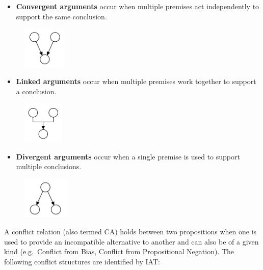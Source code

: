 \documentclass[twocolumn]{article}
\providecommand{\tightlist}{%
  \setlength{\itemsep}{0pt}\setlength{\parskip}{0pt}}
\begin{document}
\begin{itemize}
\tightlist
\item
  \textbf{Convergent arguments} occur when multiple premises act
  independently to support the same conclusion.
\end{itemize}

\begin{figure}[H]
    \centering
    \includegraphics[height=2cm]{convergent}
\end{figure}

\begin{itemize}
\tightlist
\item
  \textbf{Linked arguments} occur when multiple premises work together
  to support a conclusion.
\end{itemize}

\begin{figure}[H]
    \centering
    \includegraphics[height=2cm]{linked}
\end{figure}

\begin{itemize}
\tightlist
\item
  \textbf{Divergent arguments} occur when a single premise is used to
  support multiple conclusions.
\end{itemize}

\begin{figure}[H]
    \centering
    \includegraphics[height=2cm]{divergent}
\end{figure}

A conflict relation (also termed CA) holds between two propositions when
one is used to provide an incompatible alternative to another and can
also be of a given kind (e.g.~Conflict from Bias, Conflict from
Propositional Negation). The following conflict structures are
identified by IAT:
\end{document}
